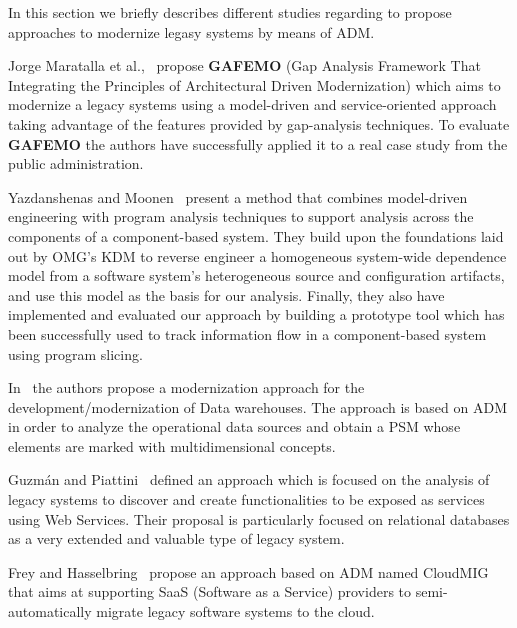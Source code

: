In this section we briefly describes different studies regarding to propose approaches to modernize legasy systems by means of ADM.  

Jorge Maratalla et al.,~\cite{6311013} propose \textbf{GAFEMO} (Gap Analysis Framework That Integrating the Principles of Architectural Driven Modernization) which aims to modernize a legacy systems using a model-driven and service-oriented approach taking advantage of the features provided by gap-analysis techniques. To evaluate \textbf{GAFEMO} the authors have successfully applied it to a real case study from the public administration. 

Yazdanshenas and Moonen~\cite{6080786} present a method that combines model-driven engineering with program analysis techniques to support analysis across the components of a component-based system. They build upon the foundations laid out by OMG's KDM to reverse engineer a homogeneous system-wide dependence model from a software system's heterogeneous source and configuration artifacts, and use this model as the basis for our analysis. Finally, they also have implemented and evaluated our approach by building a prototype tool which has been successfully used to track information flow in a component-based system using program slicing. 

In~\cite{Mazon:2007:MDM:1784489.1784497} the authors propose a modernization approach for the development/modernization of Data warehouses. The approach is based on ADM in order to analyze the operational data sources and obtain a PSM whose elements are marked with multidimensional concepts.

Guzm\'{a}n and Piattini~\cite{Guzman:2007:AAR:1339262.1339532} defined an approach which is focused on the analysis of legacy systems to discover and create functionalities to be exposed as services using Web Services. Their proposal is particularly focused on relational databases as a very extended and valuable type of legacy system.

Frey and Hasselbring~\cite{5741334, SMR:SMR582} propose an approach based on ADM named CloudMIG that aims at supporting SaaS (Software as a Service) providers to semi-automatically migrate legacy software systems to the cloud.

